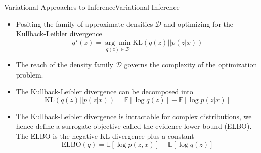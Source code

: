 \documentclass[AERbeamer%
              ,optEnglish%
              ,optBiber%
              ,optBibstyleAlphabetic%
              ,optBeamerClassicFormat%
              ]{AERlatex}%
\begin{document}
\begin{frame}[c]{Variational Approaches to Inference}{Variational Inference}
    \centering
    \begin{itemize}
        \item Positing the family of approximate densities $\mathcal{D}$ and optimizing for the Kullback-Leibler divergence
        \begin{equation*}
            q^{\star}(z) = \underset{q(z) \in \mathcal{D}}{\arg \min} \text{KL}(q(z) || p(z|x))
        \end{equation*}
        \item The reach of the density family $\mathcal{D}$ governs the complexity of the optimization problem.
        \item The Kullback-Leibler divergence can be decomposed into
        \begin{equation*}
            \text{KL}(q(z) || p(z|x)) = \mathbb{E}[\log q(z)] - \mathbb{E}[\log p(z|x)]
        \end{equation*}
        \item The Kullback-Leibler divergence is intractable for complex distributions, we hence define a surrogate objective
              called the evidence lower-bound (ELBO). The ELBO is the negative KL divergence plus a constant
        \begin{equation*}
            \text{ELBO}(q) = \mathbb{E}[\log p(z, x)] - \mathbb{E}[\log q(z)]
        \end{equation*}
    \end{itemize}
\end{frame}
\end{document}
